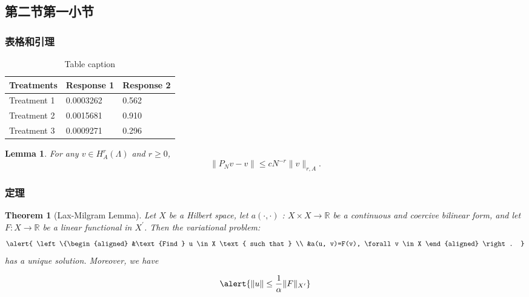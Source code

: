 \documentclass[11pt]{beamer}
\newtheorem{thm}{Theorem}
\numberwithin{thm}{section}
\numberwithin{defn}{section}
\newtheorem{lmm}{Lemma}
\numberwithin{lmm}{section}
\theoremstyle{example}
\numberwithin{figure}{section}
\numberwithin{table}{section}
\numberwithin{equation}{section}
\begin{document}
\subsection{第二节第一小节}
\begin{frame}
\frametitle{表格和引理}
\begin{table}
\caption{Table caption}
\begin{tabular}{l l l}
\toprule
\textbf{Treatments} & \textbf{Response 1} & \textbf{Response 2}\\
\midrule
Treatment 1 & 0.0003262 & 0.562 \\
Treatment 2 & 0.0015681 & 0.910 \\
Treatment 3 & 0.0009271 & 0.296 \\
\bottomrule
\end{tabular}
\end{table}
\begin{lmm}
  For any $v \in H_{A}^{r}(\Lambda)$ and $r \geq 0$,
  \begin{equation}
    \|P_{N} v-v\| \leq c N^{-r}\|v\|_{r, A}.
  \end{equation}
\end{lmm}
\end{frame}


\begin{frame}
\frametitle{定理}

\begin{thm}[Lax-Milgram Lemma]
Let $X$ be a Hilbert space, let $a(\cdot, \cdot)$ : $X \times X \rightarrow \mathbb{R}$ be a continuous and coercive bilinear form, and let $F : X \rightarrow \mathbb{R}$ be a linear functional in $X^{\prime}$. Then the variational problem:
\begin{equation}
  \alert{
  \left\{\begin{aligned}
  &\text {Find } u \in X \text { such that } \\
  &a(u, v)=F(v), \forall v \in X
  \end{aligned} \right. }
\end{equation}
has a unique solution. Moreover, we have

\begin{equation}
  \alert{ \|u\| \leq \frac{1}{\alpha}\|F\|_{X^{\prime}}  }
\end{equation}
\end{thm}

\end{frame}
\end{document}
